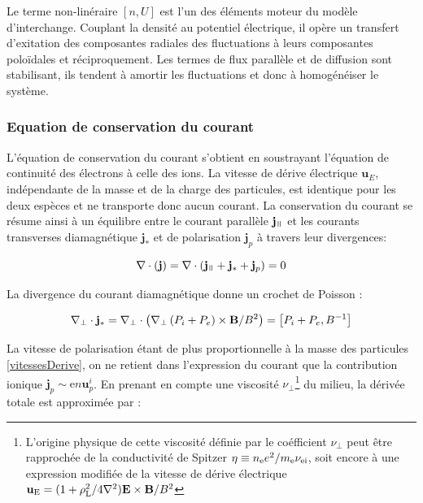 \begin{refsection}
Le terme non-linéraire $[n,U]$ est l'un des éléments moteur du modèle
d'interchange. Couplant la densité au potentiel électrique, il opère un
transfert d'exitation des composantes radiales des fluctuations à leurs
composantes poloïdales et réciproquement. Les termes de flux parallèle et de
diffusion sont stabilisant, ils tendent à
amortir les fluctuations et donc à homogénéiser le système.

\subsubsection{Equation de conservation du courant}
L'équation de conservation du courant s'obtient en soustrayant l'équation de
continuité des électrons à celle des ions. La vitesse de dérive électrique
$\mathbf{u}_E$, indépendante de la masse et de la charge des particules,
est identique pour les deux espèces et ne transporte donc aucun courant. 
La conservation du courant se résume ainsi à un équilibre entre le courant
parallèle $\mathbf{j}_\para$ et les courants transverses diamagnétique
$\mathbf{j}_*$ et de polarisation $\mathbf{j}_p$ à travers leur
divergences:

\begin{equation}
\label{EqCourant1}
\nabla\cdot\left(\mathbf{j}\right) = 
\nabla\cdot\left(\mathbf{j}_\para+\mathbf{j}_*+\mathbf{j}_p\right)
= 0
\end{equation}

La divergence du courant diamagnétique donne un crochet de Poisson :

\begin{equation}
\nabla_\perp\cdot\mathbf{j}_*=
\nabla_\perp\cdot\left(\nabla_\perp\left(
P_i+P_e\right)\times\mathbf{B}/B^2\right) = \left[P_i+P_e,B^{{-1}}\right]
\end{equation}

La vitesse de polarisation étant de plus proportionnelle à la masse des
particules \eqref{vitessesDerive}, on ne retient
dans l'expression du courant que la contribution ionique
$\mathbf{j}_p\sim\text{e}n\mathbf{u}^i_p$. En prenant en compte une viscosité
$\nu_\perp$\footnote{L'origine physique de cette viscosité définie par le
coéfficient $\nu_\perp$ peut être rapprochée de la conductivité de Spitzer
$\eta\equiv n_\text{e}e^{{2}}/m_\text{e}\nu_\text{ei}$, soit encore à
une expression modifiée de la vitesse de dérive électrique
$\mathbf{u}_\text{E}=(1+\rho_\text{L}^{{2}}/4\nabla^{{2}})\mathbf{E}\times\mathbf{B}/B^{{2}}$}
du milieu, la dérivée totale est approximée par :


\end{refsection}

